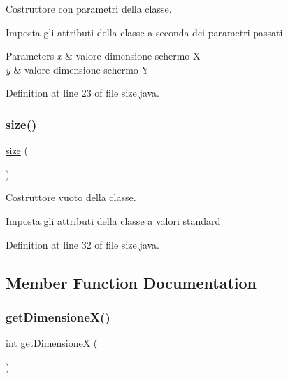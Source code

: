 Costruttore con parametri della classe. 

Imposta gli attributi della classe a seconda dei parametri passati 
\begin{DoxyParams}{Parameters}
{\em x} & valore dimensione schermo X \\
\hline
{\em y} & valore dimensione schermo Y \\
\hline
\end{DoxyParams}


Definition at line 23 of file size.\+java.

\mbox{\label{class_snake_1_1gui_1_1size_a775bfb88c1bb7975d67f277eade2a1b7}} 
\subsubsection{\texorpdfstring{size()}{size()}\hspace{0.1cm}{\footnotesize\ttfamily [2/2]}}
{\footnotesize\ttfamily \mbox{\hyperlink{class_snake_1_1gui_1_1size}{size}} (\begin{DoxyParamCaption}{ }\end{DoxyParamCaption})}



Costruttore vuoto della classe. 

Imposta gli attributi della classe a valori standard 

Definition at line 32 of file size.\+java.



\subsection{Member Function Documentation}
\mbox{\label{class_snake_1_1gui_1_1size_a9e8362afc9e8ce68cca6528eb57869a2}} 
\subsubsection{\texorpdfstring{get\+Dimensione\+X()}{getDimensioneX()}}
{\footnotesize\ttfamily int get\+DimensioneX (\begin{DoxyParamCaption}{ }\end{DoxyParamCaption})}



